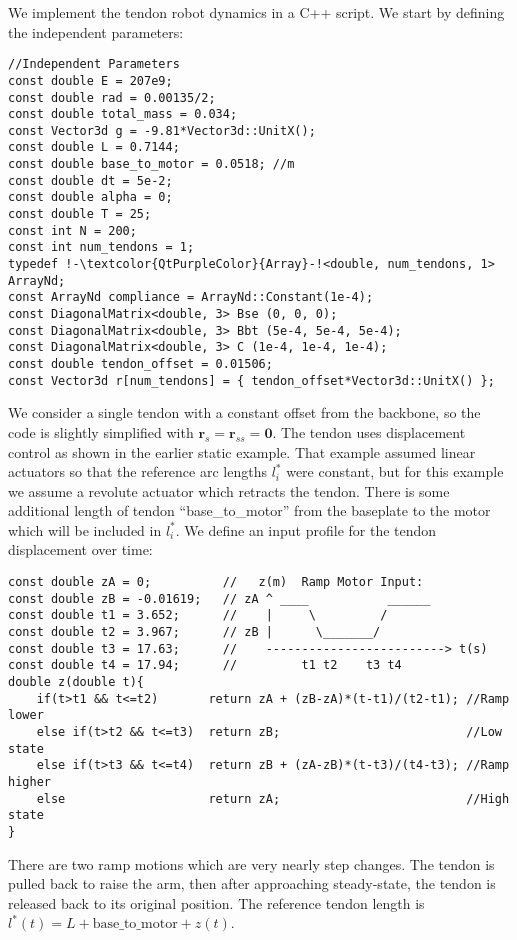 \documentclass[12pt]{article}
\begin{document}
We implement the tendon robot dynamics in a C++ script. We start by defining the independent parameters:
\begin{lstlisting}
//Independent Parameters
const double E = 207e9;
const double rad = 0.00135/2;
const double total_mass = 0.034;
const Vector3d g = -9.81*Vector3d::UnitX();
const double L = 0.7144;
const double base_to_motor = 0.0518; //m
const double dt = 5e-2;
const double alpha = 0;
const double T = 25;
const int N = 200;
const int num_tendons = 1;
typedef !-\textcolor{QtPurpleColor}{Array}-!<double, num_tendons, 1> ArrayNd;
const ArrayNd compliance = ArrayNd::Constant(1e-4);
const DiagonalMatrix<double, 3> Bse (0, 0, 0);
const DiagonalMatrix<double, 3> Bbt (5e-4, 5e-4, 5e-4);
const DiagonalMatrix<double, 3> C (1e-4, 1e-4, 1e-4);
const double tendon_offset = 0.01506;
const Vector3d r[num_tendons] = { tendon_offset*Vector3d::UnitX() };
\end{lstlisting}
We consider a single tendon with a constant offset from the backbone, so the code is slightly simplified with $\boldsymbol{r}_s = \boldsymbol{r}_{ss} = \boldsymbol{0}$. The tendon uses displacement control as shown in the earlier static example. That example assumed linear actuators so that the reference arc lengths $l_i^*$ were constant, but for this example we assume a revolute actuator which retracts the tendon. There is some additional length of tendon ``base\_to\_motor'' from the baseplate to the motor which will be included in $l_i^*$. We define an input profile for the tendon displacement over time:
\begin{lstlisting}
const double zA = 0;          //   z(m)  Ramp Motor Input:
const double zB = -0.01619;   // zA ^ ____           ______
const double t1 = 3.652;      //    |     \         /
const double t2 = 3.967;      // zB |      \_______/
const double t3 = 17.63;      //    -------------------------> t(s)
const double t4 = 17.94;      //         t1 t2    t3 t4
double z(double t){
    if(t>t1 && t<=t2)       return zA + (zB-zA)*(t-t1)/(t2-t1); //Ramp lower
    else if(t>t2 && t<=t3)  return zB;                          //Low state
    else if(t>t3 && t<=t4)  return zB + (zA-zB)*(t-t3)/(t4-t3); //Ramp higher
    else                    return zA;                          //High state
}
\end{lstlisting}
There are two ramp motions which are very nearly step changes. The tendon is pulled back to raise the arm, then after approaching steady-state, the tendon is released back to its original position. The reference tendon length is $l^*(t) = L + \text{base\_to\_motor} + z(t)$.
\end{document}

